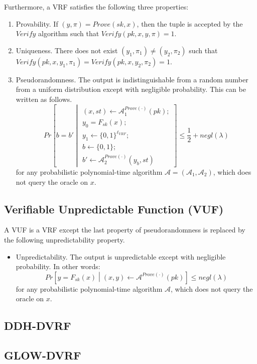 \documentclass[letterpaper,twocolumn,10pt]{article}
\theoremstyle{definition}
\theoremstyle{remark}
\begin{document}
Furthermore, a VRF satisfies the following three properties:
\begin{enumerate}
\item Provability. If $(y, \pi) = Prove(sk, x)$, then the tuple is accepted by the $Verify$ algorithm such that $Verify(pk, x, y, \pi) = 1$.
\item Uniqueness. There does not exist $(y_1, \pi_1) \neq (y_2, \pi_2)$ such that $Verify(pk, x, y_1, \pi_1) = Verify(pk, x, y_2, \pi_2) = 1$.
\item Pseudorandomness. The output is indistinguishable from a random number from a uniform distribution except with negligible probability. This can be written as follows.
\[
Pr\left[b = b' \middle\vert \begin{array}{l}
(x, st) \leftarrow \mathcal{A}^{Prove(\cdot)}_{1}(pk);\\
y_0 = F_{sk}(x);\\
y_1 \leftarrow \{0, 1\}^{\ell_{VRF}};\\
b \leftarrow \{0, 1\};\\
b' \leftarrow \mathcal{A}^{Prove(\cdot)}_{2}(y_b, st)
\end{array}\right] \leq \frac{1}{2} + negl(\lambda)
\]
for any probabilistic polynomial-time algorithm $\mathcal{A} = (\mathcal{A}_1, \mathcal{A}_2)$, which does not query the oracle on $x$.
\end{enumerate}

\subsection{Verifiable Unpredictable Function (VUF)}
A VUF \cite{micali1999verifiable,dodis2005verifiable} is a VRF except the last property of pseudorandomness is replaced by the following unpredictability property.
\begin{itemize}
\item Unpredictability. The output is unpredictable except with negligible probability. In other words:
\[
Pr\left[y = F_{sk}(x) \middle\vert (x, y) \leftarrow \mathcal{A}^{Prove(\cdot)}(pk)\right] \leq negl(\lambda)
\]
for any probabilistic polynomial-time algorithm $\mathcal{A}$, which does not query the oracle on $x$.
\end{itemize}

\subsection{DDH-DVRF}
\subsection{GLOW-DVRF}
\end{document}
